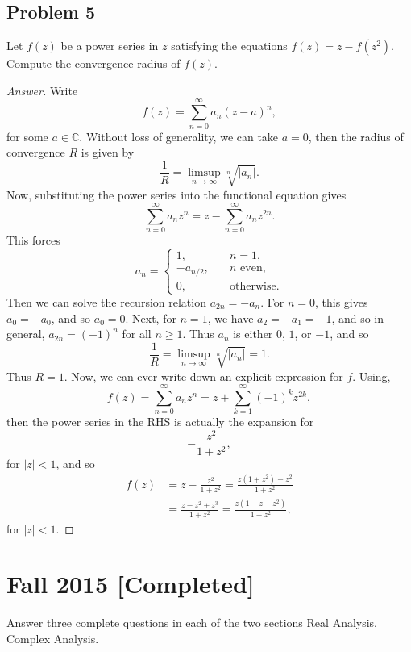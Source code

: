 \documentclass[12pt]{article}
\newcommand{\cx}{\mathbb{C}}
\newcommand\paren[1]{\left( #1 \right)}
\newcommand{\abs}[1]{\left| #1 \right|}
\theoremstyle{definition}
\begin{document}
\subsection{Problem 5 \texorpdfstring{\cite{Melody}}{}}
Let $f(z)$ be a power series in $z$ satisfying the equations $f(z) = z - f(z^2)$. Compute the convergence radius of $f(z)$.
\begin{proof}[Answer]
    Write 
    \[
        f(z) = \sum\limits_{n = 0}^{\infty} a_n (z-a)^n , 
    \]
    for some $a \in \cx$. Without loss of generality, we can take $a = 0$, then the radius of convergence $R$ is given by 
    \[
        \frac{1}{R} = \limsup\limits_{n \to \infty} \sqrt[n]{ \abs{ a_n } } . 
    \]
    Now, substituting the power series into the functional equation gives 
    \[
        \sum\limits_{n = 0}^{\infty} a_n z^n = z - \sum\limits_{n = 0}^{\infty} a_n z^{2n} . 
    \]
    This forces 
    \[
        a_n = 
        \begin{cases}
            1 , & \quad n = 1 , \\ 
            -a_{n/2} , & \quad \text{$n$ even}, \\ 
            0 , & \quad \text{otherwise}.
        \end{cases}
    \]
    Then we can solve the recursion relation $a_{2n} = -a_n$. For $n = 0$, this gives $a_0 = -a_0$, and so $a_0 = 0$. Next, for $n = 1$, we have $a_{2} = -a_1 = -1$, and so in general, $a_{2n} = (-1)^n$ for all $n \geq 1$. Thus $a_n$ is either $0$, $1$, or $-1$, and so 
    \[
        \frac{1}{R} = \limsup\limits_{n \to \infty} \sqrt[n]{ \abs{ a_n } } = 1 . 
    \]
    Thus $R = \boxed{1.}$ Now, we can ever write down an explicit expression for $f$. Using, 
    \[
        f(z) = \sum\limits_{n = 0}^{\infty} a_n z^n = z + \sum\limits_{k = 1}^{\infty} (-1)^k z^{2k} ,
    \]
    then the power series in the RHS is actually the expansion for 
    \[
        -\frac{z^2}{1 + z^2}, 
    \]
    for $\abs{z} < 1$, and so 
    \begin{align*}
        f(z) & = z - \frac{z^2}{1 + z^2} = \frac{z(1+z^2) - z^2}{1 + z^2} \\ 
        & = \frac{z - z^2 + z^3}{1 + z^2} = \frac{ z \paren{ 1 - z + z^2 } }{1 + z^2} ,
    \end{align*}
    for $\abs{z} < 1$. 
\end{proof}

\newpage
\section{Fall 2015 [Completed]}
Answer three complete questions in each of the two sections Real Analysis, Complex Analysis. 
\end{document}
